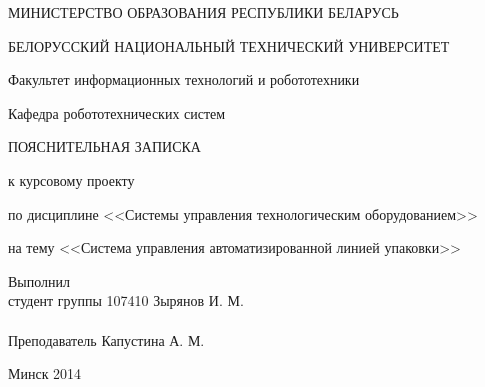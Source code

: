 \begin{titlepage} %

\thispagestyle{empty} %

\begin{center}
МИНИСТЕРСТВО ОБРАЗОВАНИЯ РЕСПУБЛИКИ БЕЛАРУСЬ

БЕЛОРУССКИЙ НАЦИОНАЛЬНЫЙ ТЕХНИЧЕСКИЙ УНИВЕРСИТЕТ

Факультет информационных технологий и робототехники

Кафедра робототехнических систем
\end{center}

\vfill

\begin{center}

    \large{ПОЯСНИТЕЛЬНАЯ ЗАПИСКА}

    \large{к курсовому проекту}

    \normalsize{по дисциплине <<Системы управления технологическим оборудованием>>}

    \normalsize{на тему <<Система управления автоматизированной линией упаковки>>}
\end{center}

\vfill

\noindent
Выполнил\\
студент группы 107410 \hfill Зырянов И. М.
\\
\\
\noindent
Преподаватель \hfill Капустина А. М.

\vfill

\centerline{Минск 2014}

\clearpage %

\end{titlepage}
\setcounter{page}{4}
